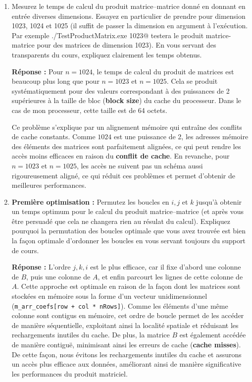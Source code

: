 \documentclass[11pt,a4paper]{article}
\begin{document}
\begin{enumerate}
	\item Mesurez le temps de calcul du produit matrice--matrice donné en donnant en entrée diverses dimensions. Essayez en particulier de prendre pour dimension 1023, 1024 et 1025 (il suffit de passer la dimension en argument à l'exécution. Par exemple \verb@./TestProductMatrix.exe 1023@ testera le produit matrice-matrice pour des matrices de dimension 1023). En vous servant des transparents du cours, expliquez clairement les temps obtenus.
	
	\textbf{Réponse :} Pour \( n = 1024 \), le temps de calcul du produit de matrices est beaucoup plus long que pour \( n = 1023 \) et \( n = 1025 \). Cela se produit systématiquement pour des valeurs correspondant à des puissances de 2 supérieures à la taille de bloc (\textbf{block size}) du cache du processeur. Dans le cas de mon processeur, cette taille est de 64 octets.  

Ce problème s'explique par un alignement mémoire qui entraîne des conflits de cache constants. Comme \( 1024 \) est une puissance de 2, les adresses mémoire des éléments des matrices sont parfaitement alignées, ce qui peut rendre les accès moins efficaces en raison du \textbf{conflit de cache}. En revanche, pour \( n = 1023 \) et \( n = 1025 \), les accès ne suivent pas un schéma aussi rigoureusement aligné, ce qui réduit ces problèmes et permet d'obtenir de meilleures performances.
	
	\item \textbf{\color{blue}Première optimisation :} Permutez les  boucles en $i,j$ et $k$ jusqu'à obtenir un temps optimum pour le calcul du produit matrice--matrice (et après vous être persuadé que cela ne changera rien au résulat du calcul). Expliquez pourquoi la permutation des boucles optimale que vous avez trouvée
	est bien la façon optimale d'ordonner les boucles en vous servant toujours du support de cours.
	
	\textbf{Réponse :} L'ordre \( j, k, i \) est le plus efficace, car il fixe d'abord une colonne de \( B \),
	 puis une colonne de \( A \), et enfin parcourt les lignes de cette colonne de \( A \).
	Cette approche est optimale en raison de la façon dont les matrices sont stockées en mémoire sous la forme d'un
	vecteur unidimensionnel (\texttt{m\_arr\_coefs[row + col * nRows]}).
	Comme les éléments d'une même colonne sont contigus en mémoire, cet ordre de boucle permet de les accéder de manière séquentielle,
	exploitant ainsi la localité spatiale et réduisant les rechargements inutiles du cache.
	De plus, la matrice \( B \) est également accédée de manière contiguë, minimisant ainsi les erreurs de cache
	(\textbf{cache misses}). De cette façon, nous évitons les rechargements inutiles du cache et assurons un accès plus
	efficace aux données, améliorant ainsi de manière significative les performances du produit matriciel.


\end{enumerate}
\end{document}
